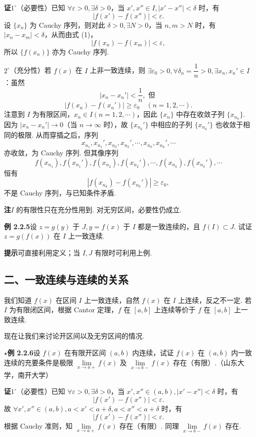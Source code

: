 \documentclass[UTF8, 12pt, fontset=fandol, oneside]{ctexart}
\begin{document}
\noindent\textbf{证}\quad $1^\circ$（必要性）已知 $\forall\varepsilon>0,\exists\delta>0$，当 $x',x''\in I,|x'-x''|<\delta$ 时，有
\[
  |f(x')-f(x'')|<\varepsilon. \tag{1}
\]
设 $\{x_n\}$ 为 Cauchy 序列，则对此 $\delta>0,\exists N>0$，当 $n,m>N$ 时，有 $|x_n-x_m|<\delta$，从而由式 (1)，
\[
  |f(x_n)-f(x_m)|<\varepsilon,
\]
所以 $\{f(x_n)\}$ 亦为 Cauchy 序列.

$2^\circ$（充分性）若 $f(x)$ 在 $I$ 上非一致连续，则 $\exists\varepsilon_0>0,\forall\delta_n=\dfrac1n>0,\exists x_n,x_n'\in I$：虽然
\[
  |x_n-x_n'|<\frac1n,\text{ 但 }
\]
\[
  |f(x_n)-f(x_n')|\ge\varepsilon_0\quad(n=1,2,\cdots). \tag{2}
\]
注意到 $I$ 为有限区间，$x_n\in I(n=1,2,\cdots)$，因此 $\{x_n\}$ 中存在收敛子列 $\{x_{n_k}\}$. 因为 $|x_n-x_n'|\to0$（当 $n\to\infty$ 时），故 $\{x_{n_k}'\}$ 中相应的子列 $\{x_{n_k}'\}$ 也收敛于相同的极限. 从而穿插之后，序列
\[
  x_{n_1},x_{n_1}',x_{n_2},x_{n_2}',\cdots,x_{n_k},x_{n_k}',\cdots
\]
亦收敛，为 Cauchy 序列. 但其像序列
\[
  f(x_{n_1}),f(x_{n_1}'),f(x_{n_2}),f(x_{n_2}'),\cdots,f(x_{n_k}),f(x_{n_k}'),\cdots
\]
恒有
\[
  |f(x_{n_k})-f(x_{n_k}')|\ge\varepsilon_0,
\]
不是 Cauchy 序列，与已知条件矛盾.

\noindent\textbf{注}\quad $I$ 的有限性只在充分性用到. 对无穷区间，必要性仍成立.

\noindent\textbf{例 2.2.5}\quad 设 $z=g(y)$ 于 $J,y=f(x)$ 于 $I$ 都是一致连续的，且 $f(I)\subset J$. 试证 $z=g(f(x))$ 在 $I$ 上一致连续.

\noindent\textbf{提示}\quad 可直接利用定义；当 $I,J$ 有限时可利用上例.

\subsection*{二、一致连续与连续的关系}

我们知道 $f(x)$ 在区间 $I$ 上一致连续，自然 $f(x)$ 在 $I$ 上连续，反之不一定. 若 $I$ 为有限闭区间，根据 Cantor 定理，$f$ 在 $[a,b]$ 上连续等价于 $f$ 在 $[a,b]$ 上一致连续.

现在让我们来讨论开区间以及无穷区间的情况.

\noindent\textbf{$\star$例 2.2.6}\quad 设 $f(x)$ 在有限开区间 $(a,b)$ 内连续，试证 $f(x)$ 在 $(a,b)$ 内一致连续的充要条件是极限 $\lim\limits_{x\to a+}f(x)$ 及 $\lim\limits_{x\to b-}f(x)$ 存在（有限）.（山东大学，南开大学）

\noindent\textbf{证}\quad $1^\circ$（必要性）已知 $\forall\varepsilon>0,\exists\delta>0$，当 $x',x''\in(a,b),|x'-x''|<\delta$ 时，有
\[
  |f(x')-f(x'')|<\varepsilon.
\]
故 $\forall x',x''\in(a,b),a<x'<a+\delta,a<x''<a+\delta$ 时，有
\[
  |f(x')-f(x'')|<\varepsilon.
\]
根据 Cauchy 准则，知 $\lim\limits_{x\to a+}f(x)$ 存在（有限）. 同理 $\lim\limits_{x\to b-}f(x)$ 存在.
\end{document}
